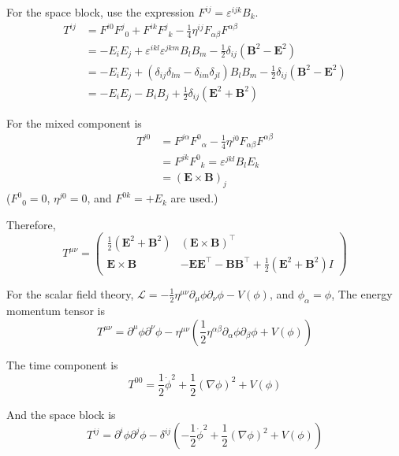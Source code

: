 \documentclass[a4paper,11pt]{article}
\begin{document}
For the space block, use the expression $F^{ij} = \varepsilon^{ijk}B_k$.
\begin{align}
    T^{ij} &= F^{i0}F^j{}_0 + F^{ik}F^{j}{}_{k} - \frac{1}{4}\eta^{ij}F_{\alpha\beta}F^{\alpha\beta} \\
    &= -E_iE_j + \varepsilon^{ikl}\varepsilon^{jkm}B_lB_m - \frac{1}{2}\delta_{ij}(\mathbf{B}^2 - \mathbf{E}^2) \\
    &= -E_iE_j + (\delta_{ij}\delta_{lm} - \delta_{im}\delta_{jl})B_lB_m - \frac{1}{2}\delta_{ij}(\mathbf{B}^2 - \mathbf{E}^2) \\
    &= -E_iE_j - B_iB_j + \frac{1}{2}\delta_{ij}(\mathbf{E}^2 + \mathbf{B}^2)
\end{align}

For the mixed component is
\begin{align}
    T^{j0} &= F^{j\alpha}F^0{}_\alpha - \frac{1}{4}\eta^{j0}F_{\alpha\beta}F^{\alpha\beta} \\
    &= F^{jk}F^{0}{}_{k} = \varepsilon^{jkl}B_lE_k \\
    &= (\mathbf{E}\times\mathbf{B})_j
\end{align}
($F^0{}_0=0$, $\eta^{j0}=0$, and $F^{0k}=+E_k$ are used.)

Therefore,
\begin{equation}
    T^{\mu\nu}=\begin{pmatrix}
        \frac{1}{2}(\mathbf{E}^2 + \mathbf{B}^2) & (\mathbf{E}\times\mathbf{B})^\top \\
        \mathbf{E}\times\mathbf{B} & -\mathbf{E}\mathbf{E}^\top - \mathbf{B}\mathbf{B}^\top + \frac{1}{2}(\mathbf{E}^2 + \mathbf{B}^2)I
    \end{pmatrix}
\end{equation}


For the scalar field theory, $\mathcal{L} = -\frac{1}{2}\eta^{\mu\nu}\partial_\mu \phi \partial_\nu \phi - V(\phi)$, and $\phi_\alpha = \phi$, The energy momentum tensor is
\begin{equation}
    T^{\mu\nu} = \partial^\mu \phi \partial^\nu \phi - \eta^{\mu\nu}\left(\frac{1}{2}\eta^{\alpha\beta}\partial_\alpha \phi \partial_\beta \phi + V(\phi)\right)
\end{equation}


The time component is
\begin{equation}
    T^{00} = \frac{1}{2}\dot{\phi}^2 + \frac{1}{2}(\nabla\phi)^2 + V(\phi)
\end{equation}

And the space block is  
\begin{equation}
    T^{ij} = \partial^i \phi \partial^j \phi - \delta^{ij}\left(-\frac{1}{2}\dot{\phi}^2 + \frac{1}{2}(\nabla\phi)^2 + V(\phi)\right)
\end{equation}
\end{document}
